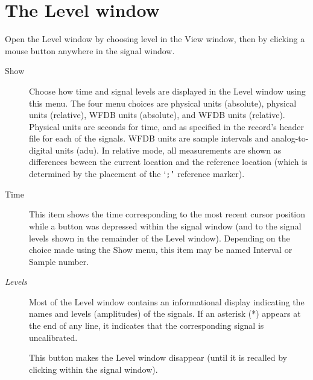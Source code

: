 \documentclass[twoside]{book}
\newcommand{\keycap}[1]{\cornersize{.5}\Ovalbox{\small\sf #1}}
\newcommand{\button}[1]{\cornersize{2}\ovalbox{\rule[-.3mm]{0cm}{2.5mm}\small\sf ~#1~}}
\newcommand{\amenubutton}[1]{{\sf #1}~\keycap{\ensuremath{\nabla}}}
\begin{document}
\section{The {\sf Level} window}

\begin{figure}[h]
\centerline{}
\end{figure}
\label{sec:level-window}
Open the {\sf Level} window by choosing {\sf level} in the {\sf View}
window, then by clicking a mouse button anywhere in the signal window.

\begin{description}
\item[\amenubutton{Show}]
Choose how time and signal levels are displayed in the {\sf Level}
window using this menu.  The four menu choices are {\sf physical units
(absolute)}, {\sf physical units (relative)}, {\sf WFDB units
(absolute)}, and {\sf WFDB units (relative)}.  Physical units are
seconds for time, and as specified in the record's header file for
each of the signals.  WFDB units are sample intervals and
analog-to-digital units (adu).  In relative mode, all measurements are
shown as differences beween the current location and the reference
location (which is determined by the placement of the `{\tt ;'}
reference marker).

\item[{\sf Time}]
This item shows the time corresponding to the most recent cursor
position while a button was depressed within the signal window (and to
the signal levels shown in the remainder of the {\sf Level} window).
Depending on the choice made using the {\sf Show} menu, this item may
be named {\sf Interval} or {\sf Sample number}.

\item[{\it Levels}]
Most of the {\sf Level} window contains an informational display
indicating the names and levels (amplitudes) of the signals.  If an
asterisk (*) appears at the end of any line, it indicates that the
corresponding signal is uncalibrated.

\item[\button{Dismiss}]
This button makes the {\sf Level} window disappear (until it is
recalled by clicking within the signal window).
\end{description}
\end{document}
